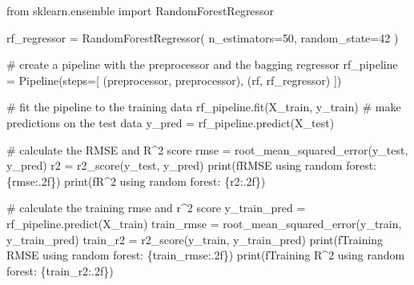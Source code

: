 \documentclass[
  letterpaper,
  DIV=11,
  numbers=noendperiod]{scrreprt}
\newenvironment{Shaded}{\begin{snugshade}}{\end{snugshade}}
\newcommand{\BuiltInTok}[1]{\textcolor[rgb]{0.00,0.23,0.31}{#1}}
\newcommand{\CommentTok}[1]{\textcolor[rgb]{0.37,0.37,0.37}{#1}}
\newcommand{\DecValTok}[1]{\textcolor[rgb]{0.68,0.00,0.00}{#1}}
\newcommand{\ImportTok}[1]{\textcolor[rgb]{0.00,0.46,0.62}{#1}}
\newcommand{\NormalTok}[1]{\textcolor[rgb]{0.00,0.23,0.31}{#1}}
\newcommand{\OperatorTok}[1]{\textcolor[rgb]{0.37,0.37,0.37}{#1}}
\newcommand{\SpecialCharTok}[1]{\textcolor[rgb]{0.37,0.37,0.37}{#1}}
\newcommand{\SpecialStringTok}[1]{\textcolor[rgb]{0.13,0.47,0.30}{#1}}
\newcommand{\StringTok}[1]{\textcolor[rgb]{0.13,0.47,0.30}{#1}}
\begin{document}
\begin{Shaded}
\begin{Highlighting}[]
\ImportTok{from}\NormalTok{ sklearn.ensemble }\ImportTok{import}\NormalTok{ RandomForestRegressor}

\NormalTok{rf\_regressor }\OperatorTok{=}\NormalTok{ RandomForestRegressor(}
\NormalTok{    n\_estimators}\OperatorTok{=}\DecValTok{50}\NormalTok{,}
\NormalTok{    random\_state}\OperatorTok{=}\DecValTok{42}
\NormalTok{)}

\CommentTok{\# create a pipeline with the preprocessor and the bagging regressor}
\NormalTok{rf\_pipeline }\OperatorTok{=}\NormalTok{ Pipeline(steps}\OperatorTok{=}\NormalTok{[}
\NormalTok{    (}\StringTok{\textquotesingle{}preprocessor\textquotesingle{}}\NormalTok{, preprocessor),}
\NormalTok{    (}\StringTok{\textquotesingle{}rf\textquotesingle{}}\NormalTok{, rf\_regressor)}
\NormalTok{])}

\CommentTok{\# fit the pipeline to the training data}
\NormalTok{rf\_pipeline.fit(X\_train, y\_train)}
\CommentTok{\# make predictions on the test data}
\NormalTok{y\_pred }\OperatorTok{=}\NormalTok{ rf\_pipeline.predict(X\_test)}

\CommentTok{\# calculate the RMSE and R\^{}2 score}
\NormalTok{rmse }\OperatorTok{=}\NormalTok{ root\_mean\_squared\_error(y\_test, y\_pred)}
\NormalTok{r2 }\OperatorTok{=}\NormalTok{ r2\_score(y\_test, y\_pred)}
\BuiltInTok{print}\NormalTok{(}\SpecialStringTok{f\textquotesingle{}RMSE using random forest: }\SpecialCharTok{\{}\NormalTok{rmse}\SpecialCharTok{:.2f\}}\SpecialStringTok{\textquotesingle{}}\NormalTok{)}
\BuiltInTok{print}\NormalTok{(}\SpecialStringTok{f\textquotesingle{}R\^{}2 using random forest: }\SpecialCharTok{\{}\NormalTok{r2}\SpecialCharTok{:.2f\}}\SpecialStringTok{\textquotesingle{}}\NormalTok{)}

\CommentTok{\# calculate the training rmse and r\^{}2 score}
\NormalTok{y\_train\_pred }\OperatorTok{=}\NormalTok{ rf\_pipeline.predict(X\_train)}
\NormalTok{train\_rmse }\OperatorTok{=}\NormalTok{ root\_mean\_squared\_error(y\_train, y\_train\_pred)}
\NormalTok{train\_r2 }\OperatorTok{=}\NormalTok{ r2\_score(y\_train, y\_train\_pred)}
\BuiltInTok{print}\NormalTok{(}\SpecialStringTok{f\textquotesingle{}Training RMSE using random forest: }\SpecialCharTok{\{}\NormalTok{train\_rmse}\SpecialCharTok{:.2f\}}\SpecialStringTok{\textquotesingle{}}\NormalTok{)}
\BuiltInTok{print}\NormalTok{(}\SpecialStringTok{f\textquotesingle{}Training R\^{}2 using random forest: }\SpecialCharTok{\{}\NormalTok{train\_r2}\SpecialCharTok{:.2f\}}\SpecialStringTok{\textquotesingle{}}\NormalTok{)}
\end{Highlighting}
\end{Shaded}
\end{document}
